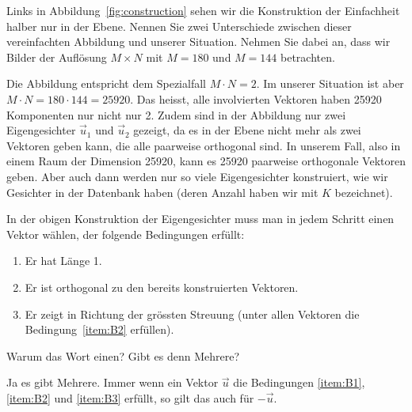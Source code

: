 \begin{aufgabe} \label{aufg:eigenface_construction_0}
	Links in Abbildung~\ref{fig:construction} sehen wir die Konstruktion der Einfachheit halber nur in der Ebene.
	Nennen Sie zwei Unterschiede zwischen dieser vereinfachten Abbildung und unserer Situation.
	Nehmen Sie dabei an, dass wir Bilder der Auflösung $M\times N$ mit $M=180$ und $M=144$ betrachten.
\end{aufgabe}
\begin{losung}
	Die Abbildung entspricht dem Spezialfall $M\cdot N=2$.
	Im unserer Situation ist aber $M\cdot N=180\cdot 144=25920$.
	Das heisst, alle involvierten Vektoren haben 25920 Komponenten nur nicht nur 2.
	Zudem sind in der Abbildung nur zwei Eigengesichter $\vec u_1$ und $\vec u_2$ gezeigt, da es in der Ebene nicht mehr als zwei Vektoren geben kann, die alle paarweise orthogonal sind.
	In unserem Fall, also in einem Raum der Dimension 25920, kann es 25920 paarweise orthogonale Vektoren geben.
	Aber auch dann werden nur so viele Eigengesichter konstruiert, wie wir Gesichter in der Datenbank haben (deren Anzahl haben wir mit $K$ bezeichnet).
\end{losung}

\begin{aufgabe} \label{aufg:eigenface_construction_1}
	In der obigen Konstruktion der Eigengesichter muss man in jedem Schritt \glqq{}einen\grqq{} Vektor wählen, der folgende Bedingungen erfüllt:
	\begin{enumerate}[label=(\alph*)]
		\item \label{item:B1} Er hat Länge 1.
		\item \label{item:B2} Er ist orthogonal zu den bereits konstruierten Vektoren.
		\item\label{item:B3} Er zeigt in Richtung der grössten Streuung (unter allen Vektoren die Bedingung~\ref{item:B2} erfüllen).
	\end{enumerate}
	Warum das Wort \glqq{}einen\grqq{}?
	Gibt es denn Mehrere?
\end{aufgabe}
\begin{losung}
	Ja es gibt Mehrere.
	Immer wenn ein Vektor $\vec u$ die Bedingungen \ref{item:B1}, \ref{item:B2} und \ref{item:B3} erfüllt, so gilt das auch für $-\vec u$.
\end{losung}

